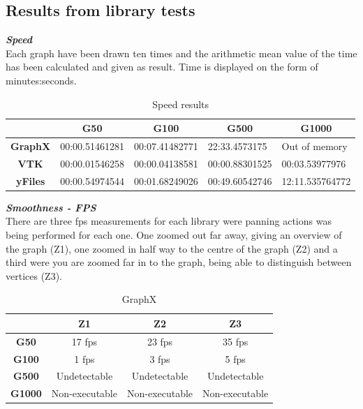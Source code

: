 \documentclass[a4paper,11pt]{kth-mag}
\begin{document}
\newpage
\subsection{Results from library tests}
\label{sec:lib:results}
\textbf{\textit{Speed}}\\
\newline
Each graph have been drawn ten times and the arithmetic mean value of the time has been calculated and given as result. Time is displayed on the form of minutes:seconds.\

\newline
\begin{table}[h]
\centering
\caption{Speed results}
\begin{tabular}{|c|l|l|l|l|}
\hline
\multicolumn{1}{|l|}{} & \multicolumn{1}{c|}{\textbf{G50}} & \multicolumn{1}{c|}{\textbf{G100}} & \multicolumn{1}{c|}{\textbf{G500}} & \multicolumn{1}{c|}{\textbf{G1000}} \\ \hline
\textbf{GraphX}        & 00:00.51461281                    & 00:07.41482771                     & 22:33.4573175                      & Out of memory                       \\ \hline
\textbf{VTK}           & 00:00.01546258                    & 00:00.04138581                     & 00:00.88301525                     & 00:03.53977976                      \\ \hline
\textbf{yFiles}        & 00:00.54974544                    & 00:01.68249026                     & 00:49.60542746                     & 12:11.535764772                     \\ \hline
\end{tabular}
\label{table:librarie-speed}
\end{table}
\newline
\textbf{\textit{Smoothness - FPS}}\\
\newline
There are three fps measurements for each library were panning actions was being performed for each one. One zoomed out far away, giving an overview of the
graph (Z1), one zoomed in half way to the centre of the graph (Z2) and a third were you are zoomed far in to the graph, being able to distinguish between vertices (Z3).
\newpage
\begin{table}[h]
\centering
\caption{GraphX}
\begin{tabular}{|c|c|c|c|}
\hline
\multicolumn{1}{|l|}{} & \textbf{Z1}    & \textbf{Z2}    & \textbf{Z3}    \\ \hline
\textbf{G50}           & 17 fps         & 23 fps         & 35 fps         \\ \hline
\textbf{G100}          & 1 fps          & 3 fps          & 5 fps          \\ \hline
\textbf{G500}          & Undetectable   & Undetectable   & Undetectable   \\ \hline
\textbf{G1000}         & Non-executable & Non-executable & Non-executable \\ \hline
\end{tabular}
\label{table-graphx}
\end{table}
\end{document}
